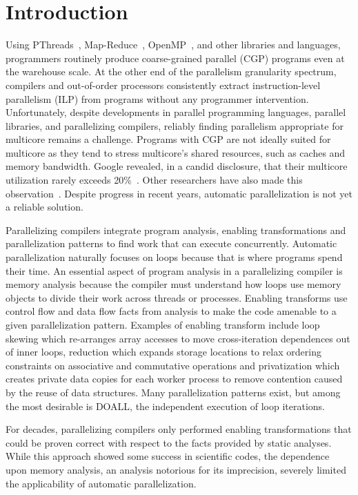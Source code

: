 \section{Introduction}

Using PThreads~\cite{pthreads:spec}, Map-Reduce~\cite{dean:04:osdi},
OpenMP~\cite{openmp:spec}, and other libraries and languages,
programmers routinely produce coarse-grained parallel (CGP) programs
even at the warehouse scale.  At the other end of the parallelism
granularity spectrum, compilers and out-of-order processors
consistently extract instruction-level parallelism (ILP) from programs
without any programmer intervention.  Unfortunately, despite
developments in parallel programming languages, parallel libraries,
and parallelizing compilers, reliably finding parallelism appropriate
for multicore remains a challenge.  Programs with CGP are not ideally
suited for multicore as they tend to stress multicore's shared
resources, such as caches and memory bandwidth.  Google revealed, in a
candid disclosure, that their multicore utilization rarely exceeds
20\%~\cite{barroso:07:computer}. Other researchers have also made this
observation~\cite{chung:13:isca}.  Despite progress in recent years,
automatic parallelization is not yet a reliable solution.

Parallelizing compilers integrate program analysis,
enabling transformations and parallelization patterns to
find work that can execute concurrently.  Automatic parallelization
naturally focuses on loops because that is where programs spend their
time.  An essential aspect of program analysis in a parallelizing
compiler is memory analysis because the compiler must understand how
loops use memory objects to divide their work across threads
or processes.  Enabling transforms use control flow and data flow
facts from analysis to make the code amenable to a given
parallelization pattern.  Examples of enabling transform include loop
skewing which re-arranges array accesses to move cross-iteration
dependences out of inner loops, reduction which expands storage
locations to relax ordering constraints on associative and commutative
operations and privatization which creates private data copies for
each worker process to remove contention caused by the reuse of data
structures.  Many parallelization patterns exist, but among the most
desirable is DOALL, the independent execution of loop iterations.

For decades, parallelizing compilers only performed enabling
transformations that could be proven correct with respect to the facts
provided by static analyses.  While this approach showed some success
in scientific codes, the dependence upon memory analysis, an analysis
notorious for its imprecision, severely limited the applicability of
automatic parallelization.

